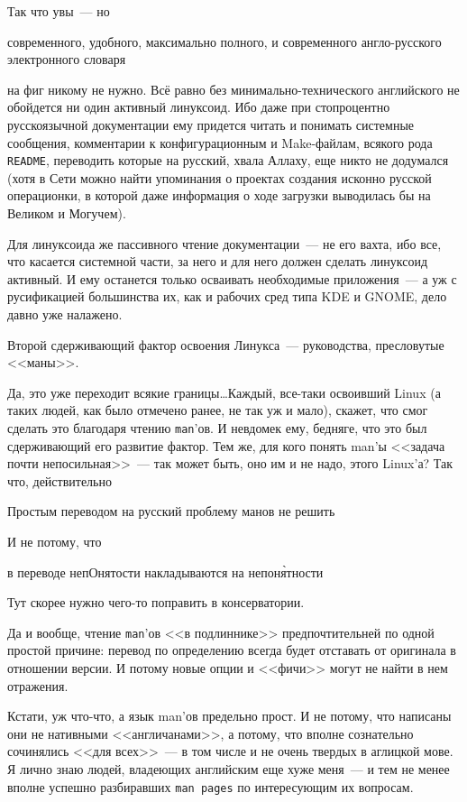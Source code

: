 Так что увы~--- но 
\begin{shadequote}{}
 современного, удобного, максимально полного, и современного англо-русского электронного словаря
\end{shadequote}

 на фиг никому не нужно. Всё равно без минимально-технического английского не обойдется ни один активный линуксоид. Ибо даже при стопроцентно русскоязычной документации ему придется читать и понимать системные сообщения, комментарии к конфигурационным и Make-файлам, всякого рода \texttt{README}, переводить которые на русский, хвала Аллаху, еще никто не додумался (хотя в Сети можно найти упоминания о проектах создания исконно русской операционки, в которой даже информация о ходе загрузки выводилась бы на Великом и Могучем). 

Для линуксоида же пассивного чтение документации~--- не его вахта, ибо все, что касается системной части, за него и для него должен сделать линуксоид активный. И ему останется только осваивать необходимые приложения~--- а уж с русификацией большинства их, как и рабочих сред типа KDE и GNOME, дело давно уже налажено. 
\begin{shadequote}{}
Второй сдерживающий фактор освоения Линукса~--- руководства, пресловутые <<маны>>.
\end{shadequote}

Да, это уже переходит всякие границы\dots Каждый, все-таки освоивший Linux (а таких людей, как было отмечено ранее, не так уж и мало), скажет, что смог сделать это благодаря чтению 
\texttt{man}'ов. И невдомек ему, бедняге, что это был сдерживающий его развитие фактор. Тем же, для кого понять man'ы <<задача почти непосильная>>~--- так может быть, оно им и не надо, этого Linux'а? Так что, действительно 
\begin{shadequote}{}
Простым переводом на русский проблему манов не решить
\end{shadequote}
И не потому, что
\begin{shadequote}{}
в переводе непОнятости накладываются на непон\`{я}тности
\end{shadequote}
Тут скорее нужно чего-то поправить в консерватории. 

Да и вообще, чтение \texttt{man}'ов <<в подлиннике>> предпочтительней по одной простой причине: перевод по определению всегда будет отставать от оригинала в отношении версии. И потому новые опции и <<фичи>> могут не найти в нем отражения. 

Кстати, уж что-что, а язык man'ов предельно прост. И не потому, что написаны они не нативными <<англичанами>>, а потому, что вполне сознательно сочинялись <<для всех>>~--- в том числе и не очень твердых в аглицкой мове. Я лично знаю людей, владеющих английским еще хуже меня~--- и тем не менее вполне успешно разбиравших \texttt{man pages} по интересующим их вопросам. 

